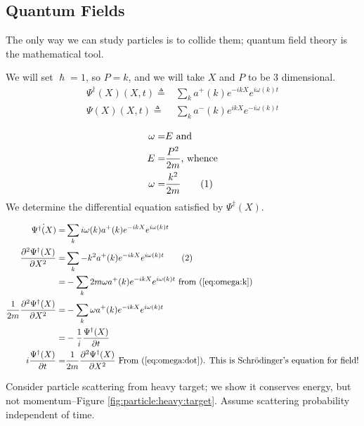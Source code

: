 \documentclass[]{article}
\newcommand\numberthis{\addtocounter{equation}{1}\tag{\theequation}}
\begin{document}
\subsection{Quantum Fields}

The only way we can study particles is to collide them; quantum field theory is the mathematical tool.

We will set $\hslash=1$, so $P=k$, and we will take $X$ and $P$ to be 3 dimensional.
\begin{align*}
\Psi^\dagger(X)(X,t) \triangleq& \sum_k a^+(k) e^{-ikX} e^{i \omega(k) t} \\
\Psi(X)(X,t) \triangleq& \sum_k a^-(k) e^{ikX} e^{- i \omega(k) t}
\end{align*}

\begin{align*}
\omega =& E \text{ and}\\
E =& \frac{P^2}{2m} \text{, whence}\\
\omega =& \frac{k^2}{2m} \numberthis \label{eq:omega:k}
\end{align*}
We  determine the differential equation satisfied by $\Psi^\dagger(X)$.

\begin{align*}
\dot{\Psi^\dagger(X)} =&  \sum_k i \omega(k) a^+(k) e^{-ikX} e^{i \omega(k) t}\\
\frac{\partial^2 \Psi^\dagger(X)}{\partial X^2} =& \sum_k -k^2 a^+(k) e^{-ikX} e^{i \omega(k) t} \numberthis \label{eq:omega:dot}\\
 =& - \sum_k 2m \omega a^+(k) e^{-ikX} e^{i \omega(k) t} \text{ from (\ref{eq:omega:k})}\\
 \frac{1}{2m} \frac{\partial^2 \Psi^\dagger(X)}{\partial X^2} =& - \sum_k \omega a^+(k) e^{-ikX} e^{i \omega(k) t}\\
 =& -\frac{1}{i} \frac{\Psi^\dagger(X)}{\partial t}\\
  i \frac{\Psi^\dagger(X)}{\partial t} =&  \frac{1}{2m} \frac{\partial^2 \Psi^\dagger(X)}{\partial X^2} \text{ From (\ref{eq:omega:dot}). This is Schr\"odinger's equation for field!}
\end{align*}

Consider particle scattering from heavy target; we show it conserves energy, but not momentum--Figure \ref{fig:particle:heavy:target}. Assume scattering probability independent of time.
\end{document}
